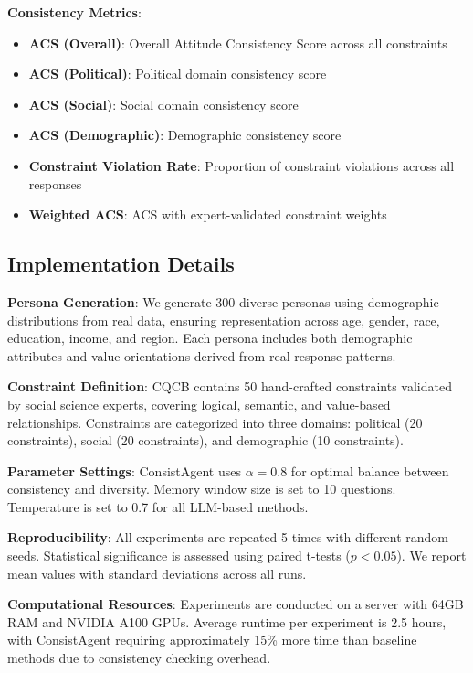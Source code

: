 \documentclass[sigconf, anonymous]{acmart}
\begin{document}
\textbf{Consistency Metrics}:
\begin{itemize}
    \item \textbf{ACS (Overall)}: Overall Attitude Consistency Score across all constraints
    \item \textbf{ACS (Political)}: Political domain consistency score
    \item \textbf{ACS (Social)}: Social domain consistency score
    \item \textbf{ACS (Demographic)}: Demographic consistency score
    \item \textbf{Constraint Violation Rate}: Proportion of constraint violations across all responses
    \item \textbf{Weighted ACS}: ACS with expert-validated constraint weights
\end{itemize}

\subsection{Implementation Details}

\textbf{Persona Generation}: We generate 300 diverse personas using demographic distributions from real data, ensuring representation across age, gender, race, education, income, and region. Each persona includes both demographic attributes and value orientations derived from real response patterns.

\textbf{Constraint Definition}: CQCB contains 50 hand-crafted constraints validated by social science experts, covering logical, semantic, and value-based relationships. Constraints are categorized into three domains: political (20 constraints), social (20 constraints), and demographic (10 constraints).

\textbf{Parameter Settings}: ConsistAgent uses $\alpha = 0.8$ for optimal balance between consistency and diversity. Memory window size is set to 10 questions. Temperature is set to 0.7 for all LLM-based methods.

\textbf{Reproducibility}: All experiments are repeated 5 times with different random seeds. Statistical significance is assessed using paired t-tests ($p < 0.05$). We report mean values with standard deviations across all runs.

\textbf{Computational Resources}: Experiments are conducted on a server with 64GB RAM and NVIDIA A100 GPUs. Average runtime per experiment is 2.5 hours, with ConsistAgent requiring approximately 15\% more time than baseline methods due to consistency checking overhead.
\end{document}
